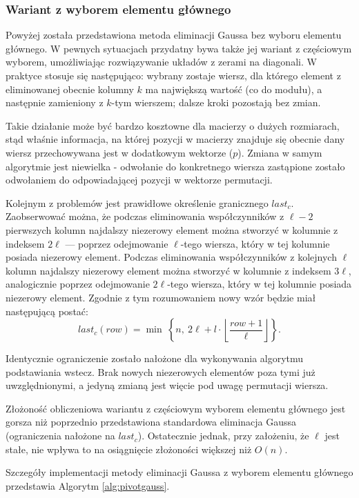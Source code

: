 \documentclass{classrep}
\begin{document}
	\subsubsection{Wariant z wyborem elementu głównego}
		Powyżej została przedstawiona metoda eliminacji Gaussa bez wyboru elementu głównego. W pewnych sytuacjach przydatny bywa także jej wariant z częściowym wyborem, umożliwiając rozwiązywanie układów z zerami na diagonali. W praktyce stosuje się następująco: wybrany zostaje wiersz, dla którego element z eliminowanej obecnie kolumny $k$ ma największą wartość (co do modułu), a następnie zamieniony z $k$-tym wierszem; dalsze kroki pozostają bez zmian.
		
		Takie działanie może być bardzo kosztowne dla macierzy o dużych rozmiarach, stąd właśnie informacja, na której pozycji w macierzy znajduje się obecnie dany wiersz przechowywana jest w dodatkowym wektorze ($p$). Zmiana w samym algorytmie jest niewielka - odwołanie do konkretnego wiersza zastąpione zostało odwołaniem do odpowiadającej pozycji w wektorze permutacji.
		
		Kolejnym z problemów jest prawidłowe określenie granicznego $last_c$. Zaobserwować można, że podczas eliminowania współczynników z $\ell - 2$ pierwszych kolumn najdalszy niezerowy element można stworzyć w kolumnie z indeksem $2\ell$ --- poprzez odejmowanie $\ell$-tego wiersza, który w tej kolumnie posiada niezerowy element. Podczas eliminowania współczynników z kolejnych $\ell$ kolumn najdalszy niezerowy element można stworzyć w kolumnie z indeksem $3\ell$, analogicznie poprzez odejmowanie $2\ell$-tego wiersza, który w tej kolumnie posiada niezerowy element. Zgodnie z tym rozumowaniem nowy wzór będzie miał następującą postać:
			$$
			last_c(row) = \min\ \left\lbrace n,~2\ell + l \cdot \left \lfloor\frac{row + 1}{\ell} \right \rfloor \right\rbrace.
			$$

		Identycznie  ograniczenie zostało nałożone dla wykonywania algorytmu podstawiania wstecz. Brak nowych niezerowych elementów poza tymi już uwzględnionymi, a jedyną zmianą jest więcie pod uwagę permutacji wiersza.
		
		Złożoność obliczeniowa wariantu z częściowym wyborem elementu głównego jest gorsza niż poprzednio przedstawiona standardowa eliminacja Gaussa (ograniczenia nałożone na $last_c$). Ostatecznie jednak, przy założeniu, że $\ell$ jest stałe, nie wpływa to na osiągnięcie złożoności większej niż $O(n)$.
		
		Szczegóły implementacji metody eliminacji Gaussa z wyborem elementu głównego przedstawia Algorytm \ref{alg:pivotgauss}.
\end{document}
